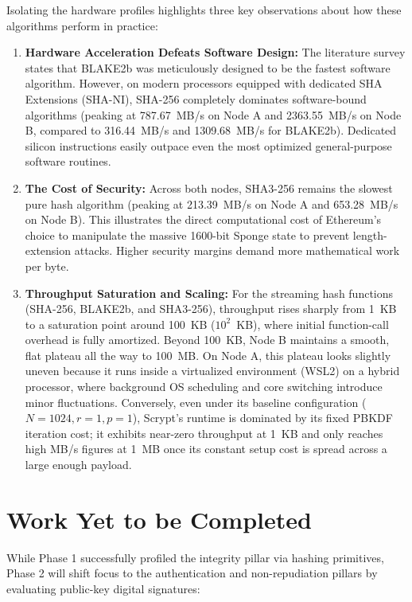 \documentclass[11pt,a4paper,oneside]{book}
\begin{document}
Isolating the hardware profiles highlights three key observations about how these algorithms perform in practice:
\begin{enumerate}
    \item \textbf{Hardware Acceleration Defeats Software Design:} The literature survey states that BLAKE2b was meticulously designed to be the fastest software algorithm. However, on modern processors equipped with dedicated SHA Extensions (SHA-NI), SHA-256 completely dominates software-bound algorithms (peaking at 787.67~MB/s on Node A and 2363.55~MB/s on Node B, compared to 316.44~MB/s and 1309.68~MB/s for BLAKE2b). Dedicated silicon instructions easily outpace even the most optimized general-purpose software routines.
    \item \textbf{The Cost of Security:} Across both nodes, SHA3-256 remains the slowest pure hash algorithm (peaking at 213.39~MB/s on Node A and 653.28~MB/s on Node B). This illustrates the direct computational cost of Ethereum's choice to manipulate the massive 1600-bit Sponge state to prevent length-extension attacks. Higher security margins demand more mathematical work per byte.
    \item \textbf{Throughput Saturation and Scaling:} For the streaming hash functions (SHA-256, BLAKE2b, and SHA3-256), throughput rises sharply from 1~KB to a saturation point around 100~KB ($10^2$~KB), where initial function-call overhead is fully amortized. Beyond 100~KB, Node B maintains a smooth, flat plateau all the way to 100~MB. On Node A, this plateau looks slightly uneven because it runs inside a virtualized environment (WSL2) on a hybrid processor, where background OS scheduling and core switching introduce minor fluctuations. Conversely, even under its baseline configuration ($N=1024, r=1, p=1$), Scrypt's runtime is dominated by its fixed PBKDF iteration cost; it exhibits near-zero throughput at 1~KB and only reaches high MB/s figures at 1~MB once its constant setup cost is spread across a large enough payload.
\end{enumerate}


\chapter{Work Yet to be Completed}

While Phase 1 successfully profiled the integrity pillar via hashing primitives, Phase 2 will shift focus to the authentication and non-repudiation pillars by evaluating public-key digital signatures:
\end{document}
